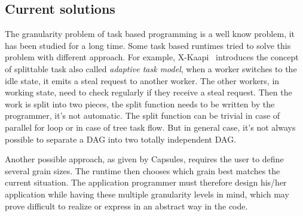 \subsection{Current solutions}
The granularity problem of task based programming is a well know problem, it has been studied for a long time.
%
Some task based runtimes tried to solve this problem with different approach.
%
For example, X-Kaapi~\cite{xkaapi} introduces the concept of splittable task also called {\em adaptive task model}, when a worker switches to the idle state, it emits a steal request to another worker.
%
The other workers, in working state, need to check regularly if they receive a steal request.
%
Then the work is split into two pieces, the split function needs to be written by the programmer, it's not automatic.
%
The split function can be trivial in case of parallel for loop or in case of tree task flow.
%
But in general case, it's not always possible to separate a DAG into two totally independent DAG.


Another possible approach, as given by Capsules\cite{capsules}, requires the user to define several grain sizes.
%
The runtime then chooses which grain best matches the current situation.
%
The application programmer must therefore design his/her application while having these multiple granularity levels in mind, which may prove difficult to realize or express in an abstract way in the code.
